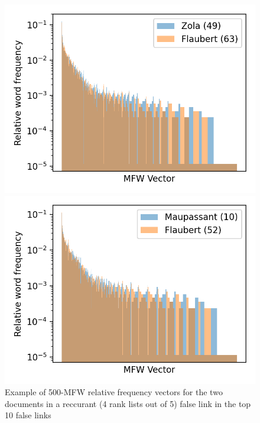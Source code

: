 \begin{figure}
  \centering
  \caption{Example of 500-MFW relative frequency vectors for the two documents in a reccurant (4 rank lists out of 5) false link in the top 10 false links}
  \label{fig:mfw_vector_error}

  \label{fig:mfw_vector_error_0}
  \includegraphics[width=\linewidth]{img/mfw_vector_error_0.png}

  \label{fig:mfw_vector_error_1}
  \includegraphics[width=\linewidth]{img/mfw_vector_error_1.png}
\end{figure}

